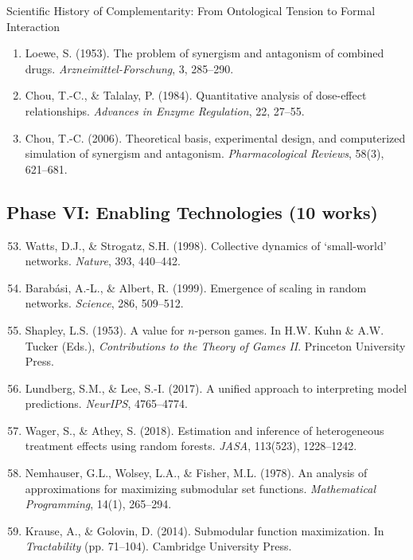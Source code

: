 \begin{chapter}{Scientific History of Complementarity: From Ontological Tension to Formal Interaction}
\begin{enumerate}
    \item Loewe, S. (1953). The problem of synergism and antagonism of combined drugs. \textit{Arzneimittel-Forschung}, 3, 285--290.

    \item Chou, T.-C., \& Talalay, P. (1984). Quantitative analysis of dose-effect relationships. \textit{Advances in Enzyme Regulation}, 22, 27--55.

    \item Chou, T.-C. (2006). Theoretical basis, experimental design, and computerized simulation of synergism and antagonism. \textit{Pharmacological Reviews}, 58(3), 621--681.
\end{enumerate}

\subsection{Phase VI: Enabling Technologies (10 works)}

\begin{enumerate}
    \setcounter{enumi}{52}
    \item Watts, D.J., \& Strogatz, S.H. (1998). Collective dynamics of `small-world' networks. \textit{Nature}, 393, 440--442.

    \item Barabási, A.-L., \& Albert, R. (1999). Emergence of scaling in random networks. \textit{Science}, 286, 509--512.

    \item Shapley, L.S. (1953). A value for $n$-person games. In H.W. Kuhn \& A.W. Tucker (Eds.), \textit{Contributions to the Theory of Games II}. Princeton University Press.

    \item Lundberg, S.M., \& Lee, S.-I. (2017). A unified approach to interpreting model predictions. \textit{NeurIPS}, 4765--4774.

    \item Wager, S., \& Athey, S. (2018). Estimation and inference of heterogeneous treatment effects using random forests. \textit{JASA}, 113(523), 1228--1242.

    \item Nemhauser, G.L., Wolsey, L.A., \& Fisher, M.L. (1978). An analysis of approximations for maximizing submodular set functions. \textit{Mathematical Programming}, 14(1), 265--294.

    \item Krause, A., \& Golovin, D. (2014). Submodular function maximization. In \textit{Tractability} (pp. 71--104). Cambridge University Press.


\end{enumerate}
\end{chapter}
